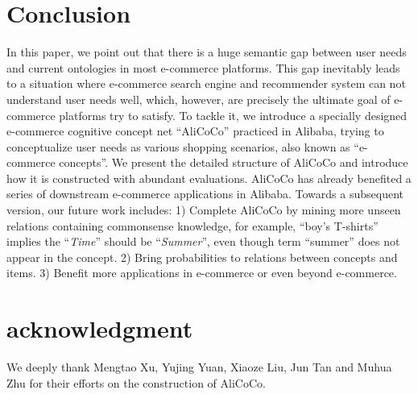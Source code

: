 \section{Conclusion}
\label{sec:conclusion}

In this paper,
we point out that there is a huge semantic gap between user needs and current ontologies in most e-commerce platforms.
This gap inevitably leads to a situation where e-commerce search engine and recommender system can not understand user needs well, 
which, however, are precisely the ultimate goal of e-commerce platforms try to satisfy.
To tackle it, we introduce a specially designed e-commerce cognitive concept net ``AliCoCo'' practiced in Alibaba, trying to conceptualize user needs as various shopping scenarios, 
also known as ``e-commerce concepts''. 
We present the detailed structure of AliCoCo and introduce how it is constructed with abundant evaluations.
AliCoCo has already benefited a series of downstream e-commerce applications in Alibaba.
Towards a subsequent version, our future work includes: 
1) Complete AliCoCo by mining more unseen relations containing commonsense knowledge, for example,
``boy's T-shirts'' implies the ``\textit{Time}'' should be ``\textit{Summer}'', even though term ``summer'' does not appear in the concept.
2) Bring probabilities to relations between concepts and items.
3) Benefit more applications in e-commerce or even beyond e-commerce.

%
%

\section{acknowledgment}
We deeply thank Mengtao Xu, Yujing Yuan, Xiaoze Liu, Jun Tan and Muhua Zhu for their efforts on the construction of AliCoCo. 


